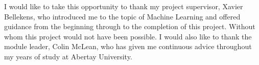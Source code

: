 \begin{acknowledgements}
I would like to take this opportunity to thank my project supervisor, Xavier Bellekens, who introduced me to the topic of Machine Learning and offered guidance from the beginning through to the completion of this project. Without whom this project would not have been possible. I would also like to thank the module leader, Colin McLean, who has given me continuous advice throughout my years of study at Abertay University.
\end{acknowledgements}